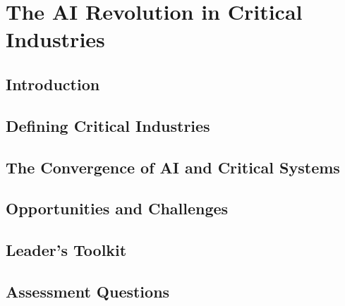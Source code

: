 \chapter{The AI Revolution in Critical Industries}
\label{chap:the_ai_revolution_in_critical_industries}

\section{Introduction}
\label{sec:ai_revolution_introduction}

\section{Defining Critical Industries}
\label{sec:defining_critical_industries}

\section{The Convergence of AI and Critical Systems}
\label{sec:convergence_of_ai}

\section{Opportunities and Challenges}
\label{sec:opportunities_and_challenges}

\section{Leader's Toolkit}
\label{sec:ai_revolution_leaders_toolkit}

\section{Assessment Questions}
\label{sec:ai_revolution_assessment_questions}